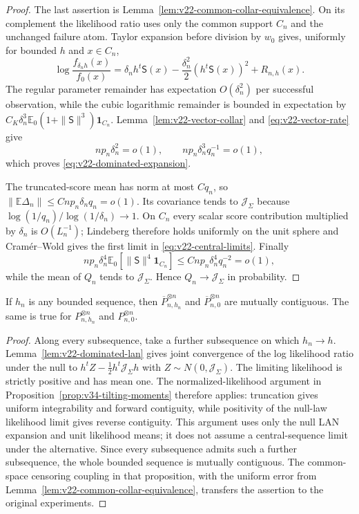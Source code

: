 \begin{proof}
The last assertion is Lemma~\ref{lem:v22-common-collar-equivalence}.  On its
complement the likelihood ratio uses only the common support $C_n$ and the
unchanged failure atom.  Taylor expansion before division by $w_0$ gives,
uniformly for bounded $h$ and $x\in C_n$,
\[
 \log\frac{f_{\delta_nh}(x)}{f_0(x)}
 =\delta_nh^t\mathsf S(x)
 -\frac{\delta_n^2}{2}(h^t\mathsf S(x))^2+R_{n,h}(x).
\]
The regular parameter remainder has expectation $O(\delta_n^2)$ per
successful observation, while the cubic logarithmic remainder is bounded in
expectation by
$C_K\delta_n^3\mathbb E_0(1+\|\mathsf S\|^3)\mathbf1_{C_n}$.
Lemma~\ref{lem:v22-vector-collar} and \eqref{eq:v22-vector-rate} give
\[
 np_n\delta_n^2=o(1),\qquad
 np_n\delta_n^3q_n^{-1}=o(1),
\]
which proves \eqref{eq:v22-dominated-expansion}.

The truncated-score mean has norm at most $Cq_n$, so
$\|\mathbb E\Delta_n\|\le Cnp_n\delta_nq_n=o(1)$.  Its covariance tends to
$\mathcal J_\Sigma$ because
$\log(1/q_n)/\log(1/\delta_n)\to1$.  On $C_n$ every scalar score contribution
multiplied by $\delta_n$ is $O(L_n^{-1})$; Lindeberg therefore holds uniformly
on the unit sphere and Cram\'er--Wold gives the first limit in
\eqref{eq:v22-central-limits}.  Finally
\[
 np_n\delta_n^4
 \mathbb E_0[\|\mathsf S\|^4\mathbf1_{C_n}]
 \le Cnp_n\delta_n^4q_n^{-2}=o(1),
\]
while the mean of $Q_n$ tends to $\mathcal J_\Sigma$.  Hence
$Q_n\to\mathcal J_\Sigma$ in probability.
\end{proof}

\begin{lemma}
\label{lem:v22-contiguity}
If $h_n$ is any bounded sequence, then
$\overline P_{n,h_n}^{\otimes n}$ and
$\overline P_{n,0}^{\otimes n}$ are mutually contiguous.  The same is true
for $P_{n,h_n}^{\otimes n}$ and $P_{n,0}^{\otimes n}$.
\end{lemma}

\begin{proof}
Along every subsequence, take a further subsequence on which $h_n\to h$.
Lemma~\ref{lem:v22-dominated-lan} gives joint convergence of the log
likelihood ratio under the null to
$h^tZ-\frac12h^t\mathcal J_\Sigma h$ with
$Z\sim N(0,\mathcal J_\Sigma)$.  The limiting likelihood is strictly
positive and has mean one.  The normalized-likelihood argument in
Proposition~\ref{prop:v34-tilting-moments} therefore applies: truncation
gives uniform integrability and forward contiguity, while positivity of
the null-law likelihood limit gives reverse contiguity.  This argument
uses only the null LAN expansion and unit likelihood means; it does not
assume a central-sequence limit under the alternative.  Since every
subsequence admits such a further subsequence, the whole bounded sequence
is mutually contiguous.  The common-space censoring coupling in that
proposition, with the uniform error from
Lemma~\ref{lem:v22-common-collar-equivalence}, transfers the assertion
to the original experiments.
\end{proof}

